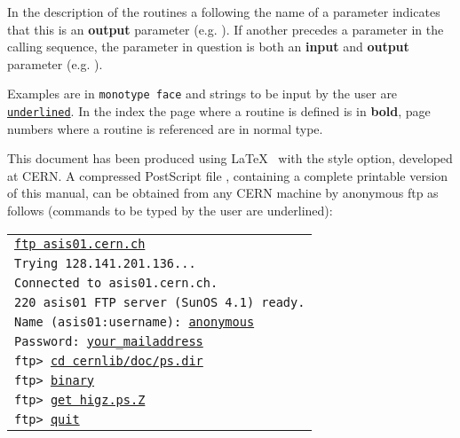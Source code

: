 In the description of the routines a \Lit{*} following
the name of a parameter indicates that this is an {\bf output} parameter
(e.g. ).
If another \Lit{*} precedes a parameter in the calling sequence, the
parameter in question is both an {\bf input} and {\bf output} parameter
(e.g. ).

Examples are in {\tt monotype face} and strings to be input by the user 
are {\tt\underline{underlined}}.
In the index the page where a routine is defined is in {\bf bold},
page numbers where a routine is referenced are in normal type.

This document has been produced using \LaTeX~\cite{bib-LATEX}
with the  style option, developed at CERN. 
A compressed PostScript file , containing a complete printable version
of this manual, can be obtained from any CERN machine
by anonymous ftp as follows
(commands to be typed by the user are underlined):

\vspace*{3mm} 
\begin{tabular}{@{\hspace{12mm}}>{\tt}l}
\underline{ftp asis01.cern.ch}\\
Trying 128.141.201.136...\\
Connected to asis01.cern.ch.\\
220 asis01 FTP server (SunOS 4.1) ready.\\
Name (asis01:username): \underline{anonymous}\\
Password: \underline{your\_{}mailaddress}\\
ftp> \underline{cd cernlib/doc/ps.dir}\\
ftp> \underline{binary}\\
ftp> \underline{get higz.ps.Z}\\
ftp> \underline{quit}\\
\end{tabular}
 
\newpage
\tableofcontents
\newpage
\listoffigures
\listoftables
 
